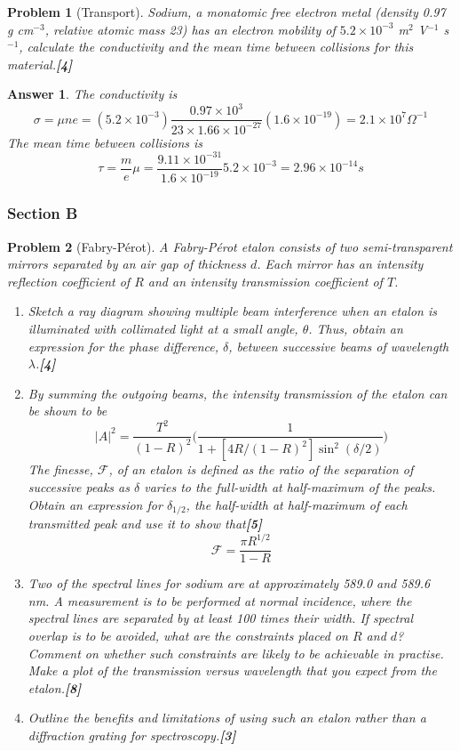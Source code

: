 \documentclass[a4paper]{article}
\newtheorem{ans}{Answer}[subsection]
\theoremstyle{new}
\newtheorem{qns}{Problem}[subsection]
\begin{document}
\begin{qns}[Transport]
Sodium, a monatomic free electron metal (density 0.97 g cm$^{-3}$, relative atomic mass 23) has an electron mobility of $5.2\times10^{-3}$ m$^2$ V$^{-1}$ s$^{-1}$,  calculate the conductivity and the mean time between collisions for this material.\hfill\textbf{[4]}
\end{qns}
\begin{ans}
The conductivity is
$$\sigma=\mu ne=(5.2\times10^{-3})\frac{0.97\times10^3}{23\times 1.66\times10^{-27}}(1.6\times10^{-19})=2.1\times10^7\Omega^{-1}$$
The mean time between collisions is 
$$\tau=\frac{m}{e}\mu=\frac{9.11\times10^{-31}}{1.6\times10^{-19}}5.2\times10^{-3}=2.96\times10^{-14}s$$
\end{ans}
\newpage
\subsubsection{Section B}
\begin{qns}[Fabry-Pérot]
A Fabry-Pérot etalon consists of two semi-transparent mirrors separated by an air gap of thickness $d$. Each mirror has an intensity reflection coefficient of $R$ and an intensity transmission coefficient of $T$.
\begin{enumerate}[label=(\alph*)]
\item Sketch a ray diagram showing multiple beam interference when an etalon is illuminated with collimated light at a small angle, $\theta$. Thus, obtain an expression for the phase difference, $\delta$, between successive beams of wavelength $\lambda$.\hfill\textbf{[4]}
\item By summing the outgoing beams, the intensity transmission of the etalon can be shown to be
$$|A|^2=\frac{T^2}{(1-R)^2}\bigg(\frac{1}{1+[4R/(1-R)^2]\sin^2(\delta/2)}\bigg)$$
The finesse, $\mathcal{F}$, of an etalon is defined as the ratio of the separation of successive peaks as $\delta$ varies to the full-width at half-maximum of the peaks. Obtain an expression for $\delta_{1/2}$, the half-width at half-maximum of each transmitted peak and use it to show that\hfill\textbf{[5]}
$$\mathcal{F}=\frac{\pi R^{1/2}}{1-R}$$
\item Two of the spectral lines for sodium are at approximately 589.0 and 589.6 nm. A measurement is to be performed at normal incidence, where the spectral lines are separated by at least 100 times their width. If spectral overlap is to be avoided, what are the constraints placed on $R$ and $d$? Comment on whether such constraints are likely to be achievable in practise. Make a plot of the transmission versus wavelength that you expect from the etalon.\hfill\textbf{[8]}
\begin{mdframed}
\color{darkblue}{You may assume the measured width of the spectral lines is determined only by the etalon properties.}
\end{mdframed}
\item Outline the benefits and limitations of using such an etalon rather than a diffraction grating for spectroscopy.\hfill\textbf{[3]}
\end{enumerate}
\end{qns}
\end{document}
